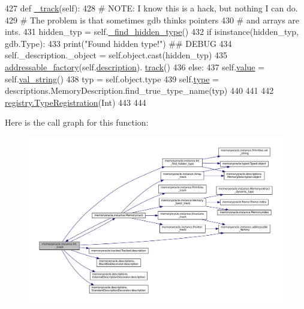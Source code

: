\begin{DoxyCode}
427     \textcolor{keyword}{def }\hyperlink{classmemoryoracle_1_1instance_1_1Int_a38c9424341353f006771163d360594da}{\_track}(self):
428         \textcolor{comment}{# NOTE: I know this is a hack, but nothing I can do.}
429         \textcolor{comment}{# The problem is that sometimes gdb thinks pointers}
430         \textcolor{comment}{# and arrays are ints.}
431         hidden\_typ = self.\hyperlink{classmemoryoracle_1_1instance_1_1Int_a450a73bc8aaf1a7ac5f18c3ed1a933fc}{\_find\_hidden\_type}()
432         \textcolor{keywordflow}{if} isinstance(hidden\_typ, gdb.Type):
433             print(\textcolor{stringliteral}{"Found hidden type!"}) \textcolor{comment}{## DEBUG}
434             self.\_description.\_object = self.object.cast(hidden\_typ)
435             \hyperlink{namespacememoryoracle_1_1instance_ac651a8635b1ae2ee7e788bf9adb17a0b}{addressable\_factory}(self.\hyperlink{classmemoryoracle_1_1tracked_1_1Tracked_abd8dc997fb5a226926f2044462dbd94b}{description}).
      \hyperlink{classmemoryoracle_1_1instance_1_1Memory_a8951ac234fecbd6cd473133ae7e63662}{track}()
436         \textcolor{keywordflow}{else}:
437             self.\hyperlink{classmemoryoracle_1_1instance_1_1Primitive_adf984d6f1bfc101cdef835b137adef55}{value} = self.\hyperlink{classmemoryoracle_1_1instance_1_1Primitive_abc513cbf3d0938c0db133e9af0a6f5ea}{val\_string}()
438             typ = self.object.type
439             self.\hyperlink{classmemoryoracle_1_1instance_1_1Memory_a17b9f6c0f548bf201e4fc636c133470b}{type} = descriptions.MemoryDescription.find\_true\_type\_name(typ)
440 
441 
442 \hyperlink{classmemoryoracle_1_1registry_1_1TypeRegistration}{registry.TypeRegistration}(Int)
443 
444 
\end{DoxyCode}


Here is the call graph for this function\+:
\nopagebreak
\begin{figure}[H]
\begin{center}
\leavevmode
\includegraphics[width=350pt]{classmemoryoracle_1_1instance_1_1Int_a38c9424341353f006771163d360594da_cgraph}
\end{center}
\end{figure}




